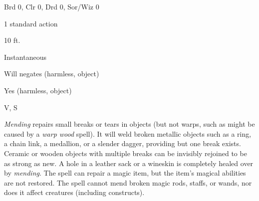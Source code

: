 
\begin{description*}
\item[Level:] Brd 0, Clr 0, Drd 0, Sor/Wiz 0
\item[Casting Time:] 1 standard action
\item[Range:] 10 ft.
\item[Duration:] Instantaneous
\item[Saving Throw:] Will negates (harmless, object)
\item[Spell Resistance:] Yes (harmless, object)
\item[Components:] V, S
\end{description*}

\textit{Mending} repairs small breaks or tears in objects (but not warps, such
as might be caused by a \textit{warp wood} spell). It will weld broken metallic
objects such as a ring, a chain link, a medallion, or a slender dagger, providing
but one break exists.
Ceramic or wooden objects with multiple breaks can be invisibly rejoined to be
as strong as new. A hole in a leather sack or a wineskin is completely healed over
by \textit{mending}. The spell can repair a magic item, but the item's magical
abilities are not restored. The spell cannot mend broken magic rods, staffs, or
wands, nor does it affect creatures (including constructs).